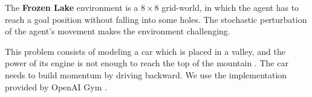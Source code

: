 The \textbf{Frozen Lake} environment is a $8\times 8$ grid-world, in which the agent has to reach a goal position without falling into some holes. The stochastic perturbation of the agent's movement makes the environment challenging.

This problem consists of modeling a car which is placed in a valley, and the power of its engine is not enough to reach the top of the mountain \cite{moore1990efficient}. The car needs to build momentum by driving backward. We use the implementation provided by OpenAI Gym \cite{brockman2016openai}.


